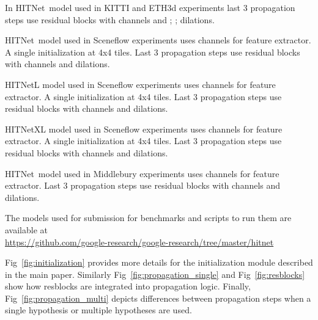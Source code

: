 \documentclass[final]{cvpr}
\newcommand{\algoname}{HITNet}
\begin{document}
In \algoname\ model used in KITTI and ETH3d experiments last 3 propagation steps use  residual blocks with  channels and ; ;  dilations.

\algoname\ model used in Sceneflow experiments uses  channels for feature extractor. A single initialization at 4x4 tiles. Last 3 propagation steps use  residual blocks with  channels and  dilations.

\algoname L model used in Sceneflow experiments uses  channels for feature extractor. A single initialization at 4x4 tiles. Last 3 propagation steps use  residual blocks with  channels and  dilations.

\algoname XL model used in Sceneflow experiments uses  channels for feature extractor. A single initialization at 4x4 tiles. Last 3 propagation steps use  residual blocks with  channels and  dilations.

\algoname\ model used in Middlebury experiments uses  channels for feature extractor. Last 3 propagation steps use  residual blocks with  channels and  dilations.

The models used for submission for benchmarks and scripts to run them are available at \\ \href{https://github.com/google-research/google-research/tree/master/hitnet}{https://github.com/google-research/google-research/tree/master/hitnet}

Fig~\ref{fig:initialization} provides more details for the initialization module described in the main paper. Similarly Fig~\ref{fig:propagation_single} and Fig~\ref{fig:resblocks} show how resblocks are integrated into propagation logic. Finally, Fig~\ref{fig:propagation_multi} depicts differences between propagation steps when a single hypothesis or multiple hypotheses are used.
\end{document}
